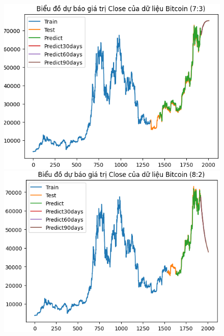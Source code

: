 \documentclass[conference]{IEEEtran}
\begin{document}
	\begin{figure}[H]
		\centering
		\begin{minipage}{0.15\textwidth}
			\centering
			\includegraphics[width=1\textwidth]{Figure/RNN_BTC73.png}
		\end{minipage}
		\hfill
		\begin{minipage}{0.15\textwidth}
			\centering
			\includegraphics[width=1\textwidth]{Figure/RNN_BTC82.png}
		\end{minipage}
		\hfill
		\begin{minipage}{0.15\textwidth}
			\centering

\end{minipage}
\end{figure}
\end{document}
